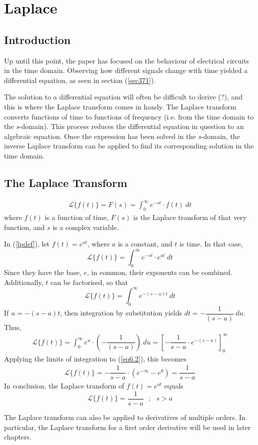 \chapter{Laplace}
\section{Introduction}
Up until this point, the paper has focused on the behaviour of electrical circuits in the time domain. Observing how different signals change with time yielded a differential equation, as seen in section (\ref{sec371}).

The solution to a differential equation will often be difficult to derive (?), and this is where the Laplace transform comes in handy. The Laplace transform converts functions of time to functions of frequency (i.e. from the time domain to the \textit{s}-domain). This process reduces the differential equation in question to an algebraic equation. Once the expression has been solved in the \textit{s}-domain, the inverse Laplace transform can be applied to find its corresponding solution in the time domain.\\
\section{The Laplace Transform}
\begin{tcolorbox}[colback=blue!5!white,colframe=blue!75!black,title=Definition]
\begin{align}
\mathcal{L}\{f(t)\}=F(s)=\int_{0}^{\infty} e^{-st}\cdot f(t)\ dt
\label{lpdef}
\end{align}
where $f(t)$ is a function of time, $F(s)$ is the Laplace transform of that very function, and $s$ is a complex variable.
\end{tcolorbox}

\begin{tcolorbox}[colback=red!5!white,colframe=red!55!black,title=Example of a Laplace transform]
In (\ref{lpdef}), let $f(t)=e^{at}$, where $a$ is a constant, and $t$ is time. In that case,
$$\mathcal{L}\{f(t)\}=\int_{0}^{\infty} e^{-st}\cdot e^{at}\ dt$$
Since they have the base, $e$, in common, their exponents can be combined. Additionally, $t$ can be factorised, so that
$$\mathcal{L}\{f(t)\}=\int_{0}^{\infty} e^{-(s-a)t}\ dt$$
If $u=-(s-a)t$, then integration by substitution yields $dt=-\dfrac{1}{(s-a)}\ du$. Thus, 
\begin{align}
\mathcal{L}\{f(t)\}=\int_{0}^{\infty} e^{u}\cdot (-\dfrac{1}{(s-a)})\ du = \left [-\dfrac{1}{s-a}\cdot e^{-(s-a)} \right]_{0}^{\infty}
\label{eq6.2}
\end{align}
Applying the limits of integration to (\ref{eq6.2}), this becomes
\begin{align*}
\mathcal{L}\{f(t)\}=-\dfrac{1}{s-a}\cdot (e^{-\infty}-e^{0})=\dfrac{1}{s-a}
\end{align*}
In conclusion, the Laplace transform of $f(t)=e^{at}$ equals
$$\mathcal{L}\{f(t)\}=\dfrac{1}{s-a} \ \ \ ;\ \ \ s>a$$
\end{tcolorbox}
The Laplace transform can also be applied to derivatives of multiple orders. In particular, the Laplace transform for a first order derivative will be used in later chapters.

